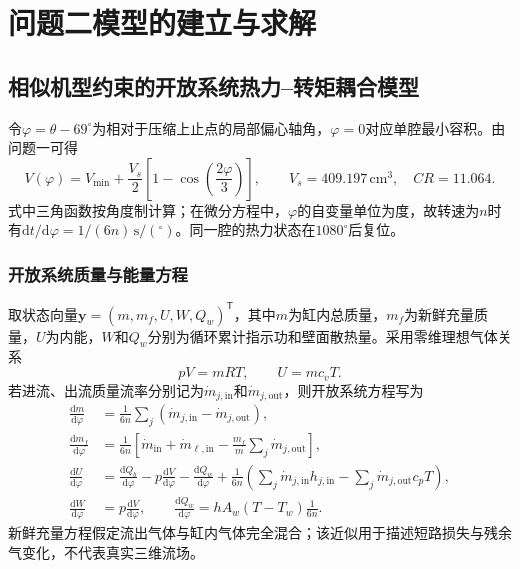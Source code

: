 \documentclass[withoutpreface,bwprint]{cumcmthesis}
\begin{document}
\section{问题二模型的建立与求解}
\subsection{相似机型约束的开放系统热力--转矩耦合模型}

令$\varphi=\theta-69^\circ$为相对于压缩上止点的局部偏心轴角，$\varphi=0$对应单腔最小容积。由问题一可得
\begin{equation}
 V(\varphi)=V_{\min}+\frac{V_s}{2}
 \left[1-\cos\left(\frac{2\varphi}{3}\right)\right],
 \qquad V_s=409.197\,\mathrm{cm^3},\quad CR=11.064 .
 \label{eq:q2-local-volume}
\end{equation}
式中三角函数按角度制计算；在微分方程中，$\varphi$的自变量单位为度，故转速为$n$时有$\mathrm dt/\mathrm d\varphi=1/(6n)\,\mathrm{s/(^\circ)}$。同一腔的热力状态在$1080^\circ$后复位。

\subsubsection{开放系统质量与能量方程}

取状态向量$\boldsymbol y=(m,m_f,U,W,Q_w)^{\mathsf T}$，其中$m$为缸内总质量，$m_f$为新鲜充量质量，$U$为内能，$W$和$Q_w$分别为循环累计指示功和壁面散热量。采用零维理想气体关系
\begin{equation}
 pV=mRT,\qquad U=mc_vT .
 \label{eq:q2-state}
\end{equation}
若进流、出流质量流率分别记为$\dot m_{j,\mathrm{in}}$和$\dot m_{j,\mathrm{out}}$，则开放系统方程写为
\begin{align}
 \frac{\mathrm dm}{\mathrm d\varphi}
 &=\frac{1}{6n}\sum_j
 \left(\dot m_{j,\mathrm{in}}-\dot m_{j,\mathrm{out}}\right),\nonumber\\
 \frac{\mathrm dm_f}{\mathrm d\varphi}
 &=\frac{1}{6n}\left[\dot m_{\mathrm{in}}+
 \dot m_{\ell,\mathrm{in}}-
 \frac{m_f}{m}\sum_j\dot m_{j,\mathrm{out}}\right],\nonumber\\
 \frac{\mathrm dU}{\mathrm d\varphi}
 &=\frac{\mathrm dQ_b}{\mathrm d\varphi}
 -p\frac{\mathrm dV}{\mathrm d\varphi}
 -\frac{\mathrm dQ_w}{\mathrm d\varphi}
 +\frac{1}{6n}\left(\sum_j\dot m_{j,\mathrm{in}}h_{j,\mathrm{in}}
 -\sum_j\dot m_{j,\mathrm{out}}c_pT\right),\nonumber\\
 \frac{\mathrm dW}{\mathrm d\varphi}&=p\frac{\mathrm dV}{\mathrm d\varphi},
 \qquad
 \frac{\mathrm dQ_w}{\mathrm d\varphi}=hA_w(T-T_w)\frac{1}{6n}.
 \label{eq:q2-open-energy}
\end{align}
新鲜充量方程假定流出气体与缸内气体完全混合；该近似用于描述短路损失与残余气变化，不代表真实三维流场。
\end{document}
